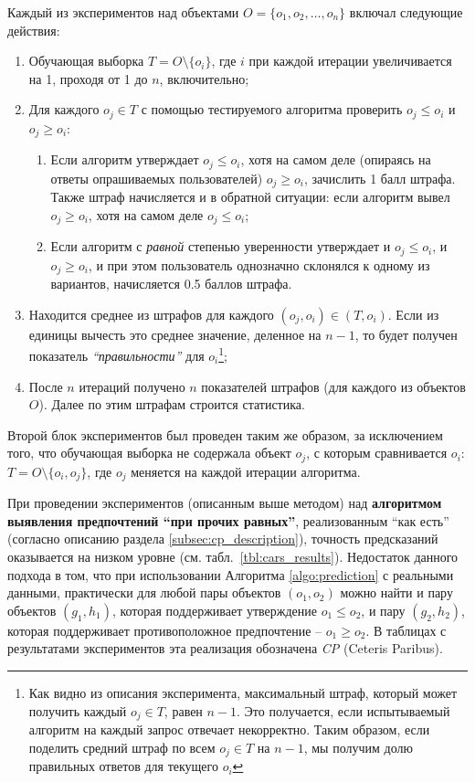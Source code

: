 	Каждый из экспериментов над объектами $O = \{o_1, o_2, \dots, o_n\}$ включал следующие действия:
	\begin{enumerate}
		\item Обучающая выборка $T = O \setminus \{o_i\}$, где $i$ при каждой итерации увеличивается на 1, проходя от 1 до $n$, включительно;
		\item Для каждого $o_j \in T$ с помощью тестируемого алгоритма проверить $o_j \leq o_i$ и $o_j \geq o_i$:
		\begin{enumerate}
			\item Если алгоритм утверждает $o_j \leq o_i$, хотя на самом деле (опираясь на ответы опрашиваемых пользователей) $o_j \geq o_i$, зачислить 1 балл штрафа. Также штраф начисляется и в обратной ситуации: если алгоритм вывел $o_j \geq o_i$, хотя на самом деле $o_j \leq o_i$;
			\item Если алгоритм с \emph{равной} степенью уверенности утверждает и $o_j \leq o_i$, и $o_j \geq o_i$, и при этом пользователь однозначно склонялся к одному из вариантов, начисляется 0.5 баллов штрафа.
		\end{enumerate} 
		\item Находится среднее из штрафов для каждого $(o_j, o_i) \in (T, o_i)$. Если из единицы вычесть это среднее значение, деленное на $n-1$, то будет получен показатель \emph{``правильности''} для $o_i$\footnote{Как видно из описания эксперимента, максимальный штраф, который может получить каждый $o_j \in T$, равен $n-1$. Это получается, если испытываемый алгоритм на каждый запрос отвечает некорректно. Таким образом, если поделить средний штраф по всем $o_j \in T$ на $n-1$, мы получим долю правильных ответов для текущего $o_i$};
		\item После $n$ итераций получено $n$ показателей штрафов (для каждого из объектов $O$). Далее по этим штрафам строится статистика.
	\end{enumerate}
	Второй блок экспериментов был проведен таким же образом, за исключением того, что обучающая выборка не содержала объект $o_j$, с которым сравнивается $o_i$: $T = O \setminus \{o_i, o_j\}$, где $o_j$ меняется на каждой итерации алгоритма.
		
	При проведении экспериментов (описанным выше методом) над \textbf{алгоритмом выявления предпочтений \enquote{при прочих равных}}, реализованным ``как есть'' (согласно описанию раздела \ref{subsec:cp_description}), точность предсказаний оказывается на низком уровне (см. табл.~\ref{tbl:cars_results}).
	Недостаток данного подхода в том, что при использовании Алгоритма \ref{algo:prediction} с реальными данными, практически для любой пары объектов $(o_1,o_2)$ можно найти и пару объектов $(g_1,h_1)$, которая поддерживает утверждение $o_1 \leq o_2$, и пару $(g_2,h_2)$, которая поддерживает противоположное предпочтение – $o_1 \geq o_2$. В таблицах с результатами экспериментов эта реализация обозначена \emph{CP} (Ceteris Paribus). 
	
